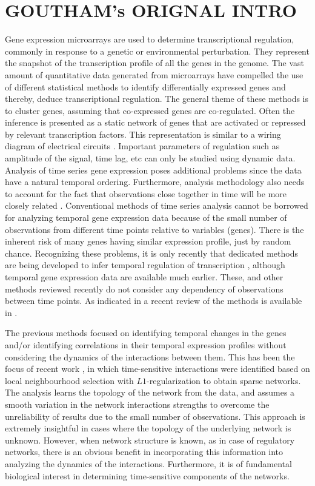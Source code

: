 \documentclass{bioinfo}
\begin{document}
\section{GOUTHAM's ORIGNAL INTRO}
Gene expression microarrays are used to determine transcriptional regulation, commonly in response to a genetic or environmental perturbation. They represent the snapshot of the transcription profile of all the genes in the genome. 
The vast amount of quantitative data generated from microarrays have compelled the use of different statistical methods to identify differentially expressed genes and thereby, deduce transcriptional regulation. 
The general theme of these methods is to cluster genes, assuming that co-expressed genes are co-regulated. Often the inference is presented as a static network of genes that are activated or repressed by relevant transcription factors. 
This representation is similar to a wiring diagram of electrical circuits \todo{[Stigler2007]}. Important parameters of regulation such as amplitude of the signal, time lag, etc can only be studied using dynamic data. 
Analysis of time series gene expression poses additional problems since the data have a natural temporal ordering. Furthermore, analysis methodology also needs to account for the fact that observations close together in time will be more closely related \todo{[Glass1993]}. 
Conventional methods of time series analysis cannot be borrowed for analyzing temporal gene expression data because of the small number of observations from different time points relative to variables (genes). 
There is the inherent risk of many genes having similar expression profile, just by random chance. Recognizing these problems, it is only recently that dedicated methods are being developed to infer temporal regulation of transcription , although temporal gene expression data are available much earlier. 
These, and other methods reviewed recently \todo{[Androulakis2007]} do not consider any dependency of observations between time points.
As indicated in a recent review of the methods is available in . 

The previous methods focused on identifying temporal changes in the genes and/or identifying correlations in their temporal expression profiles without considering the dynamics of the interactions between them. 
This has been the focus of recent work \todo{[Song2009]}, in which time-sensitive interactions were identified based on local neighbourhood selection with $L1$-regularization to obtain sparse networks. The analysis learns the topology of the network from the data, and assumes a
smooth variation in the network interactions strengths to overcome the unreliability of results due to the small number of observations. This approach is extremely insightful in cases where the topology of the underlying network is unknown. 
However, when network structure is known, as in case of regulatory networks, there is an obvious benefit in incorporating this information into analyzing the dynamics of the interactions. Furthermore, it is of fundamental biological interest in determining time-sensitive components of the networks.
\end{document}
